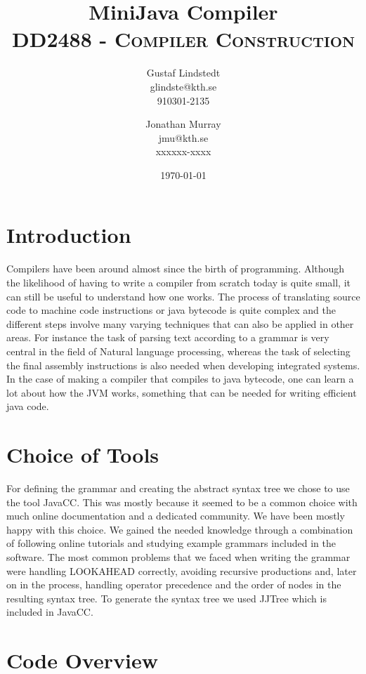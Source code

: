 \documentclass[paper=a4, fontsize=11pt]{scrartcl} %
\title{ 
\huge MiniJava Compiler \\ %
\vspace{10pt}
\normalfont \normalsize 
\textsc{DD2488 - Compiler Construction } \\ [25pt] %
}
\author{Gustaf Lindstedt \\ glindste@kth.se \\ 910301-2135 \and Jonathan Murray \\ jmu@kth.se \\ xxxxxx-xxxx}
\date{\vspace{8pt}\normalsize\today} %
\numberwithin{equation}{section} %
\numberwithin{figure}{section} %
\numberwithin{table}{section} %
\begin{document}
\maketitle

\section{Introduction}

Compilers have been around almost since the birth of programming. Although the likelihood of having to write a compiler from scratch today is quite small, it can still be useful to understand how one works. The process of translating source code to machine code instructions or java bytecode is quite complex and the different steps involve many varying techniques that can also be applied in other areas. For instance the task of parsing text according to a grammar is very central in the field of Natural language processing, whereas the task of selecting the final assembly instructions is also needed when developing integrated systems. In the case of making a compiler that compiles to java bytecode, one can learn a lot about how the JVM works, something that can be needed for writing efficient java code.

\section{Choice of Tools}
For defining the grammar and creating the abstract syntax tree we chose to use the tool JavaCC. This was mostly because it seemed to be a common choice with much online documentation and a dedicated community. We have been mostly happy with this choice. We gained the needed knowledge through a combination of following online tutorials and studying example grammars included in the software. The most common problems that we faced when writing the grammar were handling LOOKAHEAD correctly, avoiding recursive productions and, later on in the process, handling operator precedence and the order of nodes in the resulting syntax tree. To generate the syntax tree we used JJTree which is included in JavaCC.

\section{Code Overview}
\end{document}
